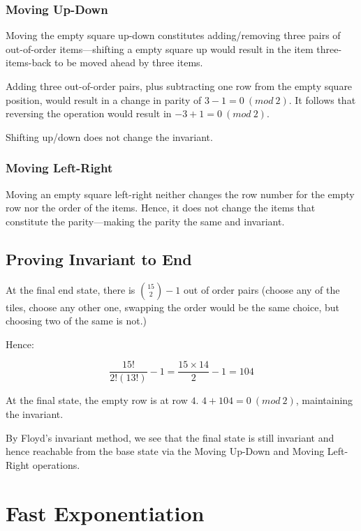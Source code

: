 \documentclass[letterpaper]{article}
\begin{document}
\subsubsection{Moving Up-Down}
\label{sec:org383927e}
Moving the empty square up-down constitutes adding/removing three pairs of out-of-order items---shifting a empty square up would result in the item three-items-back to be moved ahead by three items. 

Adding three out-of-order pairs, plus subtracting one row from the empty square position, would result in a change in parity of \(3-1 = 0\ (mod\ 2)\). It follows that reversing the operation would result in \(-3+1=0\ (mod\ 2)\).

Shifting up/down does not change the invariant.

\subsubsection{Moving Left-Right}
\label{sec:org50c69ad}
Moving an empty square left-right neither changes the row number for the empty row nor the order of the items. Hence, it does not change the items that constitute the parity---making the parity the same and invariant.

\subsection{Proving Invariant to End}
\label{sec:org79fc603}
At the final end state, there is \({15 \choose 2}-1\) out of order pairs (choose any of the tiles, choose any other one, swapping the order would be the same choice, but choosing two of the same is not.)

Hence:

\begin{equation}
\frac{15!}{2!(13!)} -1 = \frac{15\times14}{2} -1 = 104
\end{equation}

At the final state, the empty row is at row \(4\). \(4+104 = 0\ (mod\ 2)\), maintaining the invariant.

By Floyd's invariant method, we see that the final state is still invariant and hence reachable from the base state via the Moving Up-Down and Moving Left-Right operations.

\section{Fast Exponentiation}
\label{sec:org6afd8c8}
\end{document}
